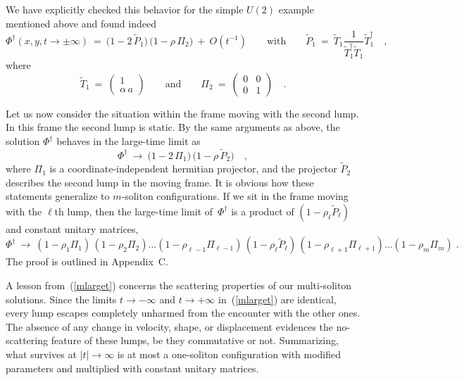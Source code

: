 \documentclass[a4paper,11pt]{article}
\numberwithin{equation}{section}
\def\a{\alpha}
\newcommand{\Tt}{\widetilde{T}}
\newcommand{\Pt}{\widetilde{P}}
\begin{document}
We have explicitly checked this behavior for the simple $U(2)$ example
mentioned above and found indeed
\begin{equation}
\Phi^\dagger(x,y,t\to\pm\infty)\ =\
\bigl(1-2\,\Pt_1\bigr)\,\bigl(1-\rho\,\Pi_2\bigr)\ +\ O(t^{-1})
\qquad\textrm{with}\qquad
\Pt_1\ =\ \Tt_1\frac{1}{\Tt_1^\dagger\Tt_1}\Tt_1^\dagger \quad,
\end{equation}
where
\begin{equation}
\Tt_1\ =\ \begin{pmatrix} 1 \\ \a\,a \end{pmatrix}
\qquad\textrm{and}\qquad
\Pi_2\ =\ \begin{pmatrix} 0 & 0 \\ 0 & 1 \end{pmatrix} \quad.
\end{equation}

Let us now consider the situation within the frame moving with the second lump.
In this frame the second lump is static. By the same arguments as above,
the solution $\Phi^\dagger$ behaves in the large-time limit as
\begin{equation} \label{larget2}
\Phi^{\dagger}\ \to\ \bigl(1-2\,\Pi_1\bigr)\,\bigl(1-\rho\,\Pt_2\bigr) \quad,
\end{equation}
where $\Pi_1$ is a coordinate-independent hermitian projector,
and the projector $\Pt_2$ describes the second lump in the moving frame.
It is obvious how these statements generalize to $m$-soliton configurations.
If we sit in the frame moving with the $\ell$th lump, then the
large-time limit of~$\Phi^\dagger$ is a product of $(1-\rho_\ell\Pt_\ell)$ and
constant unitary matrices,
\begin{equation} \label{mlarget}
\Phi^\dagger\ \to\
(1-\rho_1\Pi_1)\,(1-\rho_2\Pi_2)\ldots(1-\rho_{\ell-1}\Pi_{\ell-1})\,
(1-\rho_\ell\Pt_\ell)\,(1-\rho_{\ell+1}\Pi_{\ell+1})\ldots(1-\rho_m\Pi_m) \;.
\end{equation}
The proof is outlined in Appendix~C.

A lesson from~(\ref{mlarget}) concerns the scattering properties of
our multi-soliton solutions. Since the limits $t\to-\infty$ and $t\to+\infty$
in~(\ref{mlarget}) are identical, every lump escapes completely unharmed
from the encounter with the other ones. The absence of any change in velocity,
shape, or displacement evidences the no-scattering feature of these lumps,
be they commutative or not.
Summarizing, what survives
at $|t|\to\infty$ is at most a one-soliton configuration
with modified parameters and multiplied with constant unitary matrices.
\end{document}
